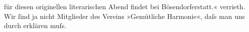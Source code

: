 \begin{ledgroupsized}[t]{13cm}
{{{                        für diesen originellen literarischen Abend findet bei Bösendorferstatt.«}}}\label{K_L00658_5h} verrieth. Wir ſind
                  ja nicht Mitglieder des Vereins »Gemütliche
                     Harmonie«, daſs man uns durch \label{K_L00658_6v}\label{K_L00658_6h} erklären
                  muſs.\pend
           \endnumbering{}\end{ledgroupsized}  \newcommand{\dateiname}{L00658}\newcommand{\titel}{Arthur Schnitzler an Hermann Bahr, 23. 3. 1897}\newcommand{\editorInnen}{ Kurt Ifkovits,  Martin Anton Müller}
            \footnotesize
\begin{ledgroupsized}[t]{11.5cm}
\end{ledgroupsized}
         
      